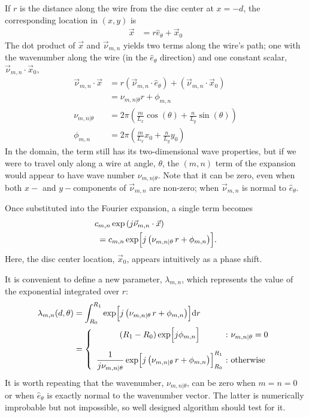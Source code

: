 \documentclass{article}
\def\d{\mathrm{d}}
\def\x{\vec{x}}
\def\eth{\hat{e}_\theta}
\def\vnu{\vec{\nu}_{m,n}}
\def\nuth{\nu_{m,n|\theta}}
\def\pmn{\phi_{m,n}}
\begin{document}
If $r$ is the distance along the wire from the disc center at $x=-d$, the corresponding location in $(x,y)$ is
\begin{align}
\x &= r \eth + \x_0
\end{align}
The dot product of $\x$ and $\vnu$ yields two terms along the wire's path; one with the wavenumber along the wire (in the $\eth$ direction) and one constant scalar, $\vnu \cdot \x_0$,
\begin{align}
\vnu \cdot \x &= r (\vnu \cdot \hat{e}_\theta) + (\vnu \cdot \x_0)\nonumber\\
 &= \nu_{m,n|\theta} r + \pmn\\
\nuth &= 2\pi \left( \frac{m}{L_x} \cos(\theta) + \frac{n}{L_y} \sin(\theta) \right)\\
\pmn &= 2\pi \left( \frac{m}{L_x} x_0 + \frac{n}{L_y} y_0 \right)
\end{align}
In the domain, the term still has its two-dimensional wave properties, but if we were to travel only along a wire at angle, $\theta$, the $(m,n)$ term of the expansion would appear to have wave number $\nuth$.  Note that it can be zero, even when both $x-$ and $y-$components of $\vnu$ are non-zero; when $\vnu$ is normal to $\eth$.

Once substituted into the Fourier expansion, a single term becomes
\begin{align*}
c_{m,n} \exp\left(j \vnu \cdot \x \right)\hspace{-8em}&\\
&= c_{m,n} \exp\Bigl[j \left(\nuth\,r + \pmn \right)\Bigr].
\end{align*}
Here, the disc center location, $\x_0$, appears intuitively as a phase shift.

It is convenient to define a new parameter, $\lambda_{m,n}$, which represents the value of the exponential integrated over $r$:
\begin{align}
\lambda_{m,n}(d,\theta) &= \int_{R_0}^{R_1} \exp\Bigl[ j \left(\nuth\,r + \pmn \right)\Bigr] \d r \nonumber\\
 &= \left\{\begin{array}{c@{\ :\ }l}
 \displaystyle (R_1 - R_0) \exp\Bigl[j \pmn \Bigr] & \nuth = 0  \vspace{1.0em} \\
\displaystyle \frac{1}{j \nuth}\exp\Bigl[j \left(\nuth\,r + \pmn \right)\Bigr]^{R_1}_{R_0} & \mathrm{otherwise}
\end{array}
\right.
\end{align}
It is worth repeating that the wavenumber, $\nuth$, can be zero when $m=n=0$ or when $\eth$ is exactly normal to the wavenumber vector.  The latter is numerically improbable but not impossible, so  well designed algorithm should test for it.
\end{document}
